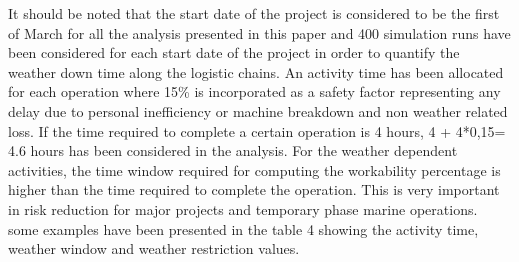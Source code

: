 It should be noted that the start date of the project is considered to be the first of March for all the analysis presented in this paper and 400 simulation runs have been considered for each start date of the project in order to quantify the weather down time along the logistic chains. An activity time has been allocated for each operation where 15\%  is incorporated as a safety factor representing any delay due to personal inefficiency or machine breakdown and non weather related loss. If the time required to complete a certain operation is 4 hours, 4 + 4*0,15= 4.6 hours has been considered in the analysis. For the weather dependent activities, the time window required for computing the workability percentage is higher than the time required to complete the operation. This is very important  in risk reduction for major projects and temporary phase marine operations. some examples have been presented in the table 4 showing the activity time, weather window and weather restriction values. 

